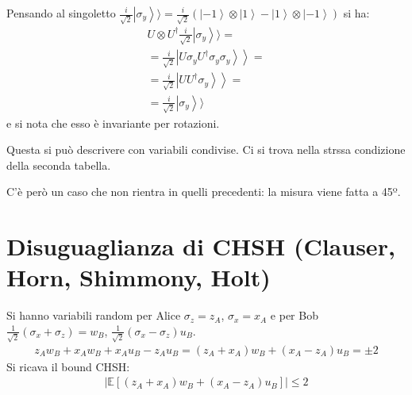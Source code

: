 Pensando al singoletto $\frac{i}{\sqrt{2}}\left |\sigma_y \right\rangle\rangle=\frac{i}{\sqrt{2}}\left(\left |-1 \right\rangle\otimes\left |1 \right\rangle-\left |1 \right\rangle\otimes\left |-1 \right\rangle\right)$ si ha:
\begin{equation}\begin{split}
U\otimes U^{\dag}\frac{i}{\sqrt{2}}\left |\sigma_y \right\rangle\rangle=\\
=\frac{i}{\sqrt{2}}\left.\left |U\sigma_y U^{\dag}\sigma_y\sigma_y \right\rangle\right\rangle=\\
=\frac{i}{\sqrt{2}}\left.\left |UU^{\dag}\sigma_y \right\rangle\right\rangle=\\
=\frac{i}{\sqrt{2}}\left |\sigma_y \right\rangle\rangle
\end{split}\end{equation}
e si nota che esso è invariante per rotazioni.


Questa si può descrivere con variabili condivise. Ci si trova nella strssa condizione della seconda tabella.

C'è però un caso che non rientra in quelli precedenti: la misura viene fatta a 45º.

\section{Disuguaglianza di CHSH (Clauser, Horn, Shimmony, Holt)} %
Si hanno variabili random per Alice $\sigma_z=z_A$, $\sigma_x=x_A$ e per Bob $\frac{1}{\sqrt{2}}\left(\sigma_x+\sigma_z\right)=w_B$, $\frac{1}{\sqrt{2}}\left(\sigma_x-\sigma_z\right)u_B$.
\begin{equation}\begin{split}
z_Aw_B+x_Aw_B+x_Au_B-z_Au_B=\left(z_A+x_A\right)w_B+\left(x_A-z_A\right)u_B= \pm 2
\end{split}\end{equation}
Si ricava il bound CHSH:
\begin{equation}\begin{split}
\left | \mathbb{E}\left[\left(z_A+x_A\right)w_B+\left(x_A-z_A\right)u_B\right] \right |\le 2
\end{split}\end{equation}

